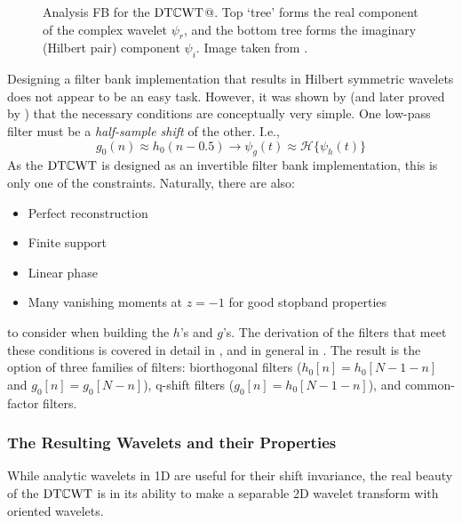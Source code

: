   \begin{figure}
    \centering
      \caption[Analysis FB for the \DTCWT]
              {Analysis FB for the $\mathrm{DT}\mathbb{C}\mathrm{WT}$@. Top `tree' forms the real
              component of the complex wavelet $\psi_r$, and the bottom tree forms the
              imaginary (Hilbert pair) component $\psi_i$. Image taken from
              \citep{selesnick_dual-tree_2005}.}
      \label{fig:dtcwt_1d_fb}
  \end{figure}

  Designing a filter bank implementation that results in Hilbert symmetric
  wavelets does not appear to be an easy task. However, it was shown
  by \citet{kingsbury_image_1999} (and later proved by
  \citet{selesnick_hilbert_2001}) that the necessary conditions are
  conceptually very simple. One low-pass filter must be a \emph{half-sample shift} of
  the other. I.e.,\ 
  \begin{equation}
    g_0(n) \approx h_0(n-0.5) \rightarrow \psi_g(t) \approx
    \mathcal{H}\{\psi_h(t)\}
  \end{equation}
  As the $\mathrm{DT}\mathbb{C}\mathrm{WT}$ is designed as an invertible filter bank implementation, this
  is only one of the constraints. Naturally, there are also:
  \begin{itemize}
    \item Perfect reconstruction
    \item Finite support
    \item Linear phase
    \item Many vanishing moments at $z=-1$ for good stopband properties
  \end{itemize}
  to consider when building the $h$'s and $g$'s.
  The derivation of the filters that meet these conditions is covered in
  detail in \citep{kingsbury_complex_2001, kingsbury_design_2003}, and in
  general in \citep{selesnick_dual-tree_2005}. The result is the
  option of three families of filters:  biorthogonal filters ($h_0[n] =
  h_0[N-1-n]$ and $g_0[n] = g_0[N-n]$), q-shift filters ($g_0[n]
  = h_0[N-1-n]$), and common-factor filters.

\subsubsection{The Resulting Wavelets and their Properties}
  While analytic wavelets in 1D are useful for their shift invariance, the real
  beauty of the $\mathrm{DT}\mathbb{C}\mathrm{WT}$ is in its ability to make a separable 2D wavelet
  transform with oriented wavelets. 
  

